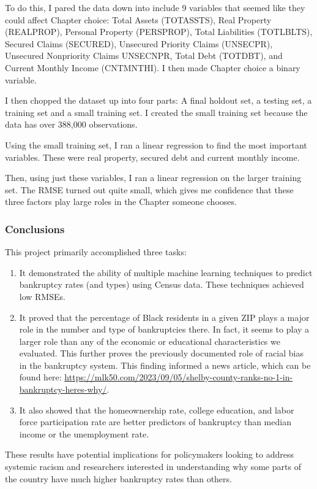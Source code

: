 \documentclass[
]{article}
\begin{document}
To do this, I pared the data down into include 9 variables that seemed
like they could affect Chapter choice: Total Assets (TOTASSTS), Real
Property (REALPROP), Personal Property (PERSPROP), Total Liabilities
(TOTLBLTS), Secured Claims (SECURED), Unsecured Priority Claims
(UNSECPR), Unsecured Nonpriority Claims UNSECNPR, Total Debt (TOTDBT),
and Current Monthly Income (CNTMNTHI). I then made Chapter choice a
binary variable.

I then chopped the dataset up into four parts: A final holdout set, a
testing set, a training set and a small training set. I created the
small training set because the data has over 388,000 observations.

Using the small training set, I ran a linear regression to find the most
important variables. These were real property, secured debt and current
monthly income.

Then, using just these variables, I ran a linear regression on the
larger training set. The RMSE turned out quite small, which gives me
confidence that these three factors play large roles in the Chapter
someone chooses.

\hypertarget{conclusions}{%
\subsubsection{Conclusions}\label{conclusions}}

This project primarily accomplished three tasks:

\begin{enumerate}
\def\labelenumi{\arabic{enumi}.}
\item
  It demonstrated the ability of multiple machine learning techniques to
  predict bankruptcy rates (and types) using Census data. These
  techniques achieved low RMSEs.
\item
  It proved that the percentage of Black residents in a given ZIP plays
  a major role in the number and type of bankruptcies there. In fact, it
  seems to play a larger role than any of the economic or educational
  characteristics we evaluated. This further proves the previously
  documented role of racial bias in the bankruptcy system. This finding
  informed a news article, which can be found here:
  \url{https://mlk50.com/2023/09/05/shelby-county-ranks-no-1-in-bankruptcy-heres-why/}.
\item
  It also showed that the homeownership rate, college education, and
  labor force participation rate are better predictors of bankruptcy
  than median income or the unemployment rate.
\end{enumerate}

These results have potential implications for policymakers looking to
address systemic racism and researchers interested in understanding why
some parts of the country have much higher bankruptcy rates than others.
\end{document}
